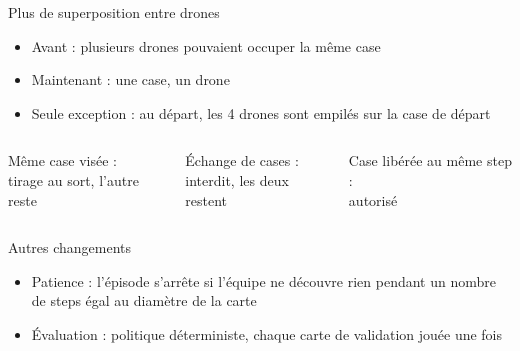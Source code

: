 \documentclass[aspectratio=169,11pt]{beamer}
\newcommand{\cell}[1]{\draw[fill=gray!15,draw=gray!60] (#1,0) rectangle ++(1,1);}
\newcommand{\drone}[3]{\node[circle,fill=#3,text=white,inner sep=1.5pt,font=\footnotesize] at (#1+0.5,0.5) {#2};}
\newcommand{\moveR}[2]{\draw[-{Latex},thick] (#1+0.5,1.1) to[bend left=45] (#2+0.5,1.1);}
\newcommand{\moveL}[2]{\draw[-{Latex},thick] (#1+0.5,1.1) to[bend right=45] (#2+0.5,1.1);}
\newcommand{\moveB}[2]{\draw[-{Latex},thick] (#1+0.5,-0.1) to[bend left=45] (#2+0.5,-0.1);}
\begin{document}
\begin{frame}{Plus de superposition entre drones}
  \begin{itemize}
    \item Avant : plusieurs drones pouvaient occuper la même case
    \item Maintenant : une case, un drone
    \item Seule exception : au départ, les 4 drones sont empilés sur la case de départ
  \end{itemize}

  \vspace{0.6em}
  \begin{columns}[T]
    \centering

    \small Même case visée :\\ tirage au sort, l'autre reste
    \centering

    \small Échange de cases :\\ interdit, les deux restent
    \centering

    \small Case libérée au même step :\\ autorisé
  \end{columns}
\end{frame}

\begin{frame}{Autres changements}
  \begin{itemize}
    \item Patience : l'épisode s'arrête si l'équipe ne découvre rien pendant un nombre de steps égal au diamètre de la carte
    \item Évaluation : politique déterministe, chaque carte de validation jouée une fois
  \end{itemize}
\end{frame}
\end{document}
